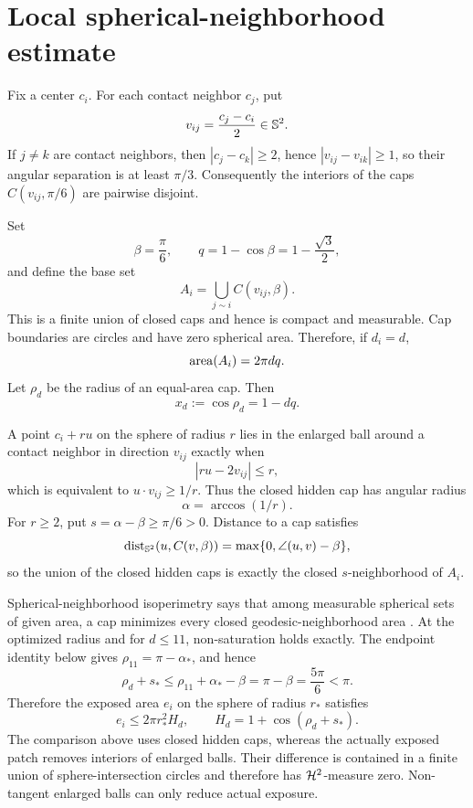 \section{Local spherical-neighborhood estimate}
\label{sec:local}

Fix a center $c_i$.  For each contact neighbor $c_j$, put
\[
 v_{ij}=\frac{c_j-c_i}{2}\in\mathbb S^2.
\]
If $j\ne k$ are contact neighbors, then $|c_j-c_k|\ge2$, hence
$|v_{ij}-v_{ik}|\ge1$, so their angular separation is at least $\pi/3$.
Consequently the interiors of the caps $C(v_{ij},\pi/6)$ are pairwise disjoint.

Set
\begin{equation}\label{eq:q}
 \beta=\frac\pi6,
 \qquad
 q=1-\cos\beta=1-\frac{\sqrt3}{2},
\end{equation}
and define the base set
\[
 A_i=\bigcup_{j\sim i} C(v_{ij},\beta).
\]
This is a finite union of closed caps and hence is compact and measurable.  Cap
boundaries are circles and have zero spherical area.  Therefore, if $d_i=d$,
\begin{equation}\label{eq:basearea}
 \operatorname{area}(A_i)=2\pi dq.
\end{equation}
Let $\rho_d$ be the radius of an equal-area cap.  Then
\begin{equation}\label{eq:xd}
 x_d:=\cos\rho_d=1-dq.
\end{equation}

A point $c_i+ru$ on the sphere of radius $r$ lies in the enlarged ball around a
contact neighbor in direction $v_{ij}$ exactly when
\[
 |ru-2v_{ij}|\le r,
\]
which is equivalent to $u\cdot v_{ij}\ge1/r$.  Thus the closed hidden cap has
angular radius
\begin{equation}\label{eq:alpha}
 \alpha=\arccos(1/r).
\end{equation}
For $r\ge2$, put $s=\alpha-\beta\ge\pi/6>0$.  Distance to a cap satisfies
\[
 \operatorname{dist}_{\mathbb S^2}(u,C(v,\beta))
 =\max\{0,\angle(u,v)-\beta\},
\]
so the union of the closed hidden caps is exactly the closed $s$-neighborhood of
$A_i$.

Spherical-neighborhood isoperimetry says that among measurable spherical sets of
given area, a cap minimizes every closed geodesic-neighborhood area
\cite{BaernsteinTaylor1976,BarnesOzgurWu2018}.  At the optimized radius and for
$d\le11$, non-saturation holds exactly.  The endpoint identity below gives
$\rho_{11}=\pi-\alpha_*$, and hence
\begin{equation}\label{eq:nonsaturation}
 \rho_d+s_*
 \le\rho_{11}+\alpha_*-\beta
 =\pi-\beta
 =\frac{5\pi}{6}<\pi.
\end{equation}
Therefore the exposed area $e_i$ on the sphere of radius $r_*$ satisfies
\begin{equation}\label{eq:exposure}
 e_i\le2\pi r_*^2H_d,
 \qquad
 H_d=1+\cos(\rho_d+s_*).
\end{equation}
The comparison above uses closed hidden caps, whereas the actually exposed patch
removes interiors of enlarged balls.  Their difference is contained in a finite
union of sphere-intersection circles and therefore has $\mathcal H^2$-measure zero.
Non-tangent enlarged balls can only reduce actual exposure.
